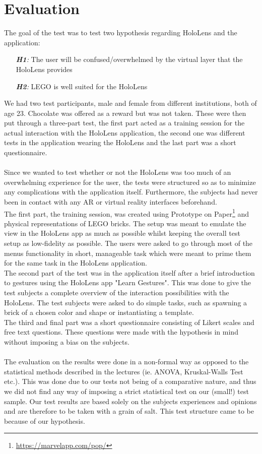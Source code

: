 
\section{Evaluation}
The goal of the test was to test two hypothesis regarding HoloLens and the application:
\begin{itemize}
	\item[\textit{\textbf{H1}:}] The user will be confused/overwhelmed by the virtual layer that the HoloLens provides
	\item[\textit{\textbf{H2}:}] LEGO is well suited for the HoloLens
\end{itemize}
We had two test participants, male and female from different institutions, both of age 23. Chocolate was offered as a reward but was not taken. These were then put through a three-part test, the first part acted as a training session for the actual interaction with the HoloLens application, the second one was different tests in the application wearing the HoloLens and the last part was a short questionnaire.\\
\\
Since we wanted to test whether or not the HoloLens was too much of an overwhelming experience for the user, the tests were structured so as to minimize any complications with the application itself. Furthermore, the subjects had never been in contact with any AR or virtual reality interfaces beforehand.\\
The first part, the training session, was created using Prototype on Paper\footnote{\url{https://marvelapp.com/pop/}} and physical representations of LEGO bricks. The setup was meant to emulate the view in the HoloLens app as much as possible whilst keeping the overall test setup as low-fidelity as possible. The users were asked to go through most of the menus functionality in short, manageable task which were meant to prime them for the same task in the HoloLens application.\\
The second part of the test was in the application itself after a brief introduction to gestures using the HoloLens app "Learn Gestures". This was done to give the test subjects a complete overview of the interaction possibilities with the HoloLens. The test subjects were asked to do simple tasks, such as spawning a brick of a chosen color and shape or instantiating a template.\\
The third and final part was a short questionnaire consisting of Likert scales and free text questions. These questions were made with the hypothesis in mind without imposing a bias on the subjects.\\
\\
The evaluation on the results were done in a non-formal way as opposed to the statistical methods described in the lectures (ie. ANOVA, Kruskal-Walls Test etc.). This was done due to our tests not being of a comparative nature, and thus we did not find any way of imposing a strict statistical test on our (small!) test sample. Our test results are based solely on the subjects experiences and opinions and are therefore to be taken with a grain of salt. This test structure came to be because of our hypothesis.

